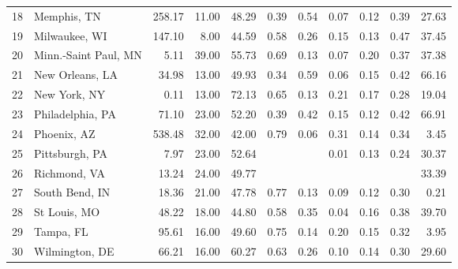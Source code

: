 \documentclass[12pt]{amsart}
\begin{document}
\begin{table}[ht]
{\begin{tabular}{rlrrrrrrrrr}
  18 & Memphis, TN & 258.17 & 11.00 & 48.29 & 0.39 & 0.54 & 0.07 & 0.12 & 0.39 & 27.63 \\ 
  19 & Milwaukee, WI & 147.10 & 8.00 & 44.59 & 0.58 & 0.26 & 0.15 & 0.13 & 0.47 & 37.45 \\ 
  20 & Minn.-Saint Paul, MN & 5.11 & 39.00 & 55.73 & 0.69 & 0.13 & 0.07 & 0.20 & 0.37 & 37.38 \\ 
  21 & New Orleans, LA & 34.98 & 13.00 & 49.93 & 0.34 & 0.59 & 0.06 & 0.15 & 0.42 & 66.16 \\ 
  22 & New York, NY & 0.11 & 13.00 & 72.13 & 0.65 & 0.13 & 0.21 & 0.17 & 0.28 & 19.04 \\ 
  23 & Philadelphia, PA & 71.10 & 23.00 & 52.20 & 0.39 & 0.42 & 0.15 & 0.12 & 0.42 & 66.91 \\ 
  24 & Phoenix, AZ & 538.48 & 32.00 & 42.00 & 0.79 & 0.06 & 0.31 & 0.14 & 0.34 & 3.45 \\ 
  25 & Pittsburgh, PA & 7.97 & 23.00 & 52.64 &  &  & 0.01 & 0.13 & 0.24 & 30.37 \\ 
  26 & Richmond, VA & 13.24 & 24.00 & 49.77 &  &  &  &  &  & 33.39 \\ 
  27 & South Bend, IN & 18.36 & 21.00 & 47.78 & 0.77 & 0.13 & 0.09 & 0.12 & 0.30 & 0.21 \\ 
  28 & St Louis, MO & 48.22 & 18.00 & 44.80 & 0.58 & 0.35 & 0.04 & 0.16 & 0.38 & 39.70 \\ 
  29 & Tampa, FL & 95.61 & 16.00 & 49.60 & 0.75 & 0.14 & 0.20 & 0.15 & 0.32 & 3.95 \\ 
  30 & Wilmington, DE & 66.21 & 16.00 & 60.27 & 0.63 & 0.26 & 0.10 & 0.14 & 0.30 & 29.60 \\ 
   \hline\hline
\end{tabular}
}
\end{table}
\end{document}
